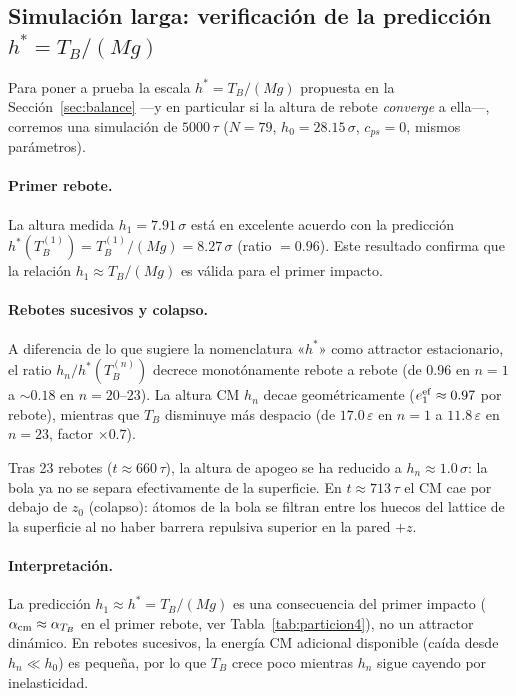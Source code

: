 \documentclass[aps,pre,twocolumn,reprint,superscriptaddress]{revtex4-2}
\newcommand{\eps}{\varepsilon}
\begin{document}
\subsection{Simulación larga: verificación de la predicción \texorpdfstring{$h^*=T_B/(Mg)$}{h*}}
\label{sec:largo}

Para poner a prueba la escala $h^*=T_B/(Mg)$ propuesta en la
Sección~\ref{sec:balance} ---y en particular si la altura de rebote
\emph{converge} a ella---, corremos una simulación de $5000\,\tau$
($N=79$, $h_0=28.15\,\sigma$, $c_{ps}=0$, mismos parámetros).

\paragraph{Primer rebote.}
La altura medida $h_1=7.91\,\sigma$ está en excelente acuerdo con la predicción
$h^*(T_B^{(1)})=T_B^{(1)}/(Mg)=8.27\,\sigma$ (ratio $=0.96$).
Este resultado confirma que la relación $h_1\approx T_B/(Mg)$ es válida para
el primer impacto.

\paragraph{Rebotes sucesivos y colapso.}
A diferencia de lo que sugiere la nomenclatura «$h^*$» como attractor
estacionario, el ratio $h_n/h^*(T_B^{(n)})$ decrece monotónamente rebote a
rebote (de 0.96 en $n=1$ a $\sim0.18$ en $n=20$--$23$).
La altura CM $h_n$ decae geométricamente ($e_1^{\rm ef}\approx0.97$ por rebote),
mientras que $T_B$ disminuye más despacio (de $17.0\,\eps$ en $n=1$ a
$11.8\,\eps$ en $n=23$, factor $\times0.7$).

Tras 23 rebotes ($t\approx660\,\tau$), la altura de apogeo se ha reducido a
$h_n\approx1.0\,\sigma$: la bola ya no se separa efectivamente de la
superficie. En $t\approx713\,\tau$ el CM cae por debajo de $z_0$
(colapso): átomos de la bola se filtran entre los huecos del lattice de
la superficie al no haber barrera repulsiva superior en la pared $+z$.

\paragraph{Interpretación.}
La predicción $h_1\approx h^*=T_B/(Mg)$ es una consecuencia del primer impacto
($\alpha_{\rm cm}\approx\alpha_{T_B}$ en el primer rebote, ver
Tabla~\ref{tab:particion4}), no un attractor dinámico. En rebotes sucesivos,
la energía CM adicional disponible (caída desde $h_n\ll h_0$) es pequeña,
por lo que $T_B$ crece poco mientras $h_n$ sigue cayendo por inelasticidad.
\end{document}
